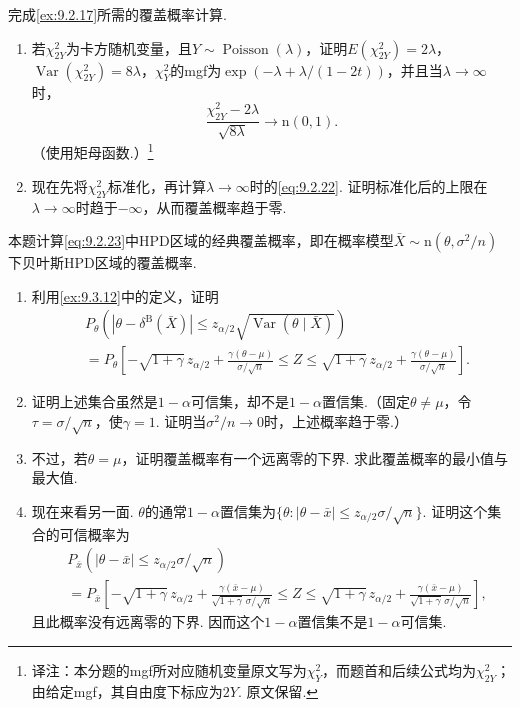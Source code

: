\begin{exercise}\label{exercise:9.31}
完成\autoref{ex:9.2.17}所需的覆盖概率计算.
\begin{enumerate}
\item 若$\chi^2_{2Y}$为卡方随机变量，且$Y\sim\operatorname{Poisson}(\lambda)$，证明$E(\chi^2_{2Y})=2\lambda$，$\operatorname{Var}(\chi^2_{2Y})=8\lambda$，$\chi^2_Y$的mgf为$\exp(-\lambda+\lambda/(1-2t))$，并且当$\lambda\to\infty$时，
$$\frac{\chi^2_{2Y}-2\lambda}{\sqrt{8\lambda}}\to\mathrm n(0,1).$$
（使用矩母函数.）\footnote{译注：本分题的mgf所对应随机变量原文写为$\chi_Y^2$，而题首和后续公式均为$\chi_{2Y}^2$；由给定mgf，其自由度下标应为$2Y$. 原文保留.}
\item 现在先将$\chi^2_{2Y}$标准化，再计算$\lambda\to\infty$时的\eqref{eq:9.2.22}. 证明标准化后的上限在$\lambda\to\infty$时趋于$-\infty$，从而覆盖概率趋于零.
\end{enumerate}
\end{exercise}
\begin{exercise}\label{exercise:9.32}
本题计算\eqref{eq:9.2.23}中HPD区域的经典覆盖概率，即在概率模型$\bar X\sim\mathrm n(\theta,\sigma^2/n)$下贝叶斯HPD区域的覆盖概率.
\begin{enumerate}
\item 利用\autoref{ex:9.3.12}中的定义，证明
$$\begin{aligned}
&P_\theta\left(|\theta-\delta^{\mathrm B}(\bar X)|\le z_{\alpha/2}\sqrt{\operatorname{Var}(\theta\mid\bar X)}\right)\\
&=P_\theta\left[-\sqrt{1+\gamma}\,z_{\alpha/2}+\frac{\gamma(\theta-\mu)}{\sigma/\sqrt n}\le Z\le\sqrt{1+\gamma}\,z_{\alpha/2}+\frac{\gamma(\theta-\mu)}{\sigma/\sqrt n}\right].
\end{aligned}$$
\item 证明上述集合虽然是$1-\alpha$可信集，却不是$1-\alpha$置信集.（固定$\theta\ne\mu$，令$\tau=\sigma/\sqrt n$，使$\gamma=1$. 证明当$\sigma^2/n\to0$时，上述概率趋于零.）
\item 不过，若$\theta=\mu$，证明覆盖概率有一个远离零的下界. 求此覆盖概率的最小值与最大值.
\item 现在来看另一面. $\theta$的通常$1-\alpha$置信集为$\{\theta:|\theta-\bar x|\le z_{\alpha/2}\sigma/\sqrt n\}$. 证明这个集合的可信概率为
$$\begin{aligned}
&P_{\bar x}(|\theta-\bar x|\le z_{\alpha/2}\sigma/\sqrt n)\\
&=P_{\bar x}\left[-\sqrt{1+\gamma}\,z_{\alpha/2}+\frac{\gamma(\bar x-\mu)}{\sqrt{1+\gamma}\,\sigma/\sqrt n}\le Z\le\sqrt{1+\gamma}\,z_{\alpha/2}+\frac{\gamma(\bar x-\mu)}{\sqrt{1+\gamma}\,\sigma/\sqrt n}\right],
\end{aligned}$$
且此概率没有远离零的下界. 因而这个$1-\alpha$置信集不是$1-\alpha$可信集.
\end{enumerate}
\end{exercise}
